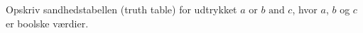 Opskriv sandhedstabellen (truth table) for udtrykket $a \text{ or } b \text{ and } c$, hvor $a$, $b$ og $c$ er boolske værdier.
